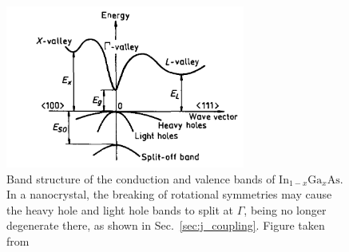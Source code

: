 \begin{figure}
\begin{center}
\includegraphics[width=0.7\textwidth]{figures/ingaas_band_structure}
\caption{Band structure of the conduction and valence bands of $\text{In}_{1-x}\text{Ga}_x\text{As}$. In a nanocrystal, the breaking of rotational symmetries may cause the heavy hole and light hole bands to split at $\Gamma$, being no longer degenerate there, as shown in Sec.~\ref{sec:j_coupling}. Figure taken from \cite[Fig.~3.2.1]{semiconductor_handbook} \label{fig:ingaas_band_structure}}
\end{center}
\end{figure}

